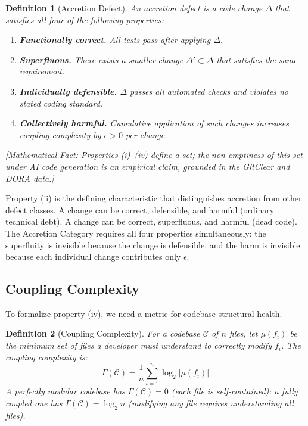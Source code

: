 \documentclass[11pt, a4paper, copyright]{googledeepmind}
\newtheorem{definition}{Definition}[section]
\begin{document}
\begin{definition}[Accretion Defect]
\label{def:accretion}
An \emph{accretion defect} is a code change $\Delta$ that satisfies all four of the following properties:
\begin{enumerate}[nosep]
    \item \textbf{Functionally correct.} All tests pass after applying $\Delta$.
    \item \textbf{Superfluous.} There exists a smaller change $\Delta' \subset \Delta$ that satisfies the same requirement.
    \item \textbf{Individually defensible.} $\Delta$ passes all automated checks and violates no stated coding standard.
    \item \textbf{Collectively harmful.} Cumulative application of such changes increases coupling complexity by $\epsilon > 0$ per change.
\end{enumerate}
\end{definition}

\emph{[Mathematical Fact: Properties (i)--(iv) define a set; the non-emptiness of this set under AI code generation is an empirical claim, grounded in the GitClear and DORA data.]}

Property (ii) is the defining characteristic that distinguishes accretion from other defect classes. A change can be correct, defensible, and harmful (ordinary technical debt). A change can be correct, superfluous, and harmful (dead code). The Accretion Category requires all four properties simultaneously: the superfluity is invisible because the change is defensible, and the harm is invisible because each individual change contributes only $\epsilon$.

\subsection{Coupling Complexity}

To formalize property (iv), we need a metric for codebase structural health.

\begin{definition}[Coupling Complexity]
\label{def:coupling-complexity}
For a codebase $\mathcal{C}$ of $n$ files, let $\mu(f_i)$ be the minimum set of files a developer must understand to correctly modify $f_i$. The \emph{coupling complexity} is:
\begin{equation}
\Gamma(\mathcal{C}) = \frac{1}{n} \sum_{i=1}^{n} \log_2 |\mu(f_i)|
\end{equation}
A perfectly modular codebase has $\Gamma(\mathcal{C}) = 0$ (each file is self-contained); a fully coupled one has $\Gamma(\mathcal{C}) = \log_2 n$ (modifying any file requires understanding all files).
\end{definition}
\end{document}
